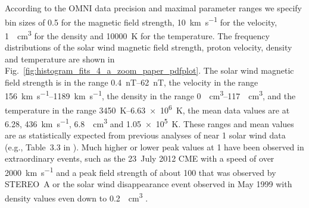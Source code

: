 \documentclass[]{aa}
\begin{document}
	According to the OMNI data precision and maximal parameter ranges we specify bin sizes of \SI{0.5}{\nT} for the magnetic field strength, \SI{10}{\km\per\s} for the velocity, \SI{1}{\per\cm\cubed} for the density and \SI{10000}{\K} for the temperature. The frequency distributions of the solar wind magnetic field strength, proton velocity, density and temperature are shown in Fig.~\ref{fig:histogram_fits_4_a_zoom_paper_pdfplot}.
	The solar wind magnetic field strength is in the range \SIrange{0.4}{62}{nT}, the velocity in the range \SIrange{156}{1189}{\km\per\s}, the density in the range \SIrange{0}{117}{\per\cm\cubed}, and the temperature in the range \SIrange{3450}{6.63e6}{\K}, the mean data values are at \SI{6.28}{\nT}, \SI{436}{\km\per\s}, \SI{6.8}{\per\cm\cubed} and \SI{1.05e5}{\K}. These ranges and mean values are as statistically expected from previous analyses of near \SI{1}{\au} solar wind data (e.g., Table~3.3 in \citet[p.~39]{Bothmer2007}).
	Much higher or lower peak values at \SI{1}{\au} have been observed in extraordinary events, such as the 23~July 2012 CME with a speed of over \SI{2000}{\km\per\s} and a peak field strength of about \SI{100}{\nT} that was observed by STEREO~A \citep{Russell2013} or the solar wind disappearance event observed in May 1999 with density values even down to \SI{0.2}{\per\cm\cubed} \citep{Lazarus2000}.
\end{document}
